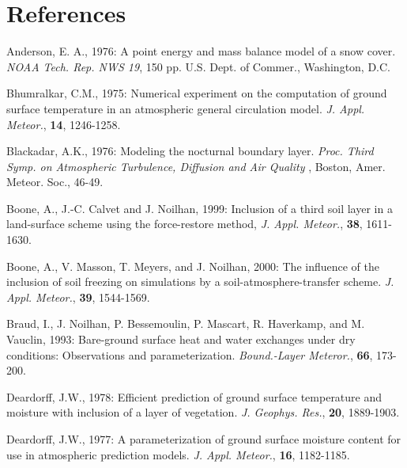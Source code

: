 \section{References}

\begin{description}

\item
Anderson, E. A., 1976:
A point energy and mass balance model of a snow cover.
{\it NOAA Tech. Rep. NWS 19}, 150 pp. U.S. Dept. of
Commer., Washington, D.C.

\item
Bhumralkar, C.M., 1975:
Numerical experiment on the computation of ground surface
temperature in an atmospheric general circulation model.
{\em J. Appl. Meteor.}, {\bf 14}, 1246-1258.

\item
Blackadar, A.K., 1976:
Modeling the nocturnal boundary layer.
{\em Proc. Third Symp. on Atmospheric Turbulence,
Diffusion and Air Quality }, Boston, Amer. Meteor. Soc., 46-49.


\item
Boone, A.,
J.-C. Calvet and J. Noilhan, 1999:
Inclusion of a third soil layer in a
land-surface scheme using the force-restore method,
{\em J. Appl. Meteor.},
{\bf 38},
1611-1630.

\item
Boone, A.,
V. Masson, T. Meyers, and J. Noilhan, 2000:
The influence of the inclusion of soil freezing
on simulations by a soil-atmosphere-transfer scheme.
{\em J. Appl. Meteor.}, {\bf 39}, 1544-1569.

\item
Braud, I., J. Noilhan, P. Bessemoulin, P. Mascart, R. Haverkamp,
and M. Vauclin, 1993:
Bare-ground surface heat and water exchanges under dry conditions:
Observations and parameterization.
{\em Bound.-Layer Meteror.},
{\bf 66},
173-200.

\item
Deardorff, J.W., 1978:
Efficient prediction of ground surface temperature and moisture
with inclusion of a layer of vegetation.
{\em J. Geophys. Res.},
{\bf 20},
1889-1903.

\item
Deardorff, J.W., 1977:
A parameterization of ground surface moisture content for
use in atmospheric prediction models.
{\em J. Appl. Meteor.},
{\bf 16},
1182-1185.


\end{description}
